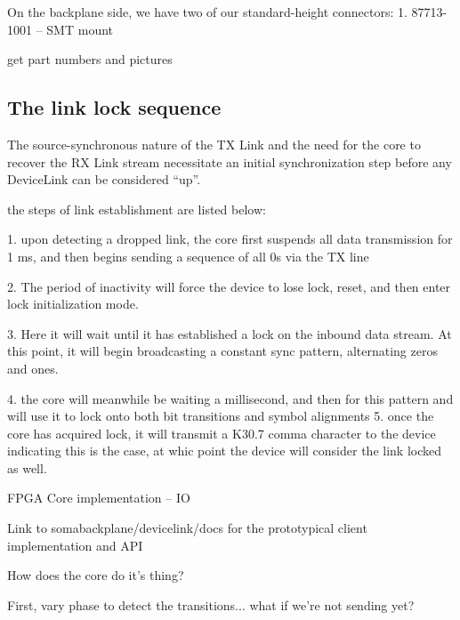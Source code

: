 On the backplane side, we have two of our standard-height connectors: 
  1. 87713-1001 -- SMT mount

get part numbers and pictures



\subsection{The link lock sequence}


The source-synchronous nature of the TX Link and the need for the core to recover the RX Link stream necessitate an initial synchronization step before any DeviceLink can be considered ``up''. 


the steps of link establishment are listed below: 

1. upon detecting a dropped link, the core first suspends all data transmission for 1 ms, and then begins sending a sequence of all 0s via the TX line


2. The period of inactivity will force the device to lose lock, reset, and then enter lock initialization mode. 

3. Here it will wait until it has established a lock on the inbound data stream. At this point, it will begin broadcasting a constant sync pattern, alternating zeros and ones. 

4. the core will meanwhile be waiting a millisecond, and then  for this pattern and will use it to lock onto both bit transitions and symbol alignments
5. once the core has acquired lock, it will transmit a  K30.7 comma character to the device indicating this is the case, at whic point the device will consider the link locked as well. 

FPGA Core implementation -- IO 

Link to somabackplane/devicelink/docs for the prototypical client implementation and API 



How does the core do it's thing? 

First, vary phase to detect the transitions... what if we're not sending yet? 

